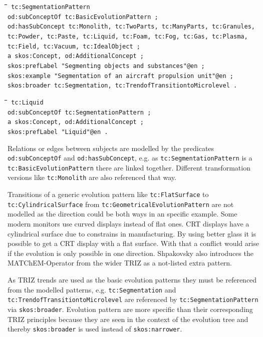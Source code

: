 \documentclass[11pt,a4paper]{article}
\newenvironment{code}{\tt \begin{tabbing}
\hskip12pt\=\hskip12pt\=\hskip12pt\=\hskip12pt\=\hskip5cm\=\hskip5cm\=\kill}
{\end{tabbing}}
\begin{document}
\begin{code}\tt
tc:SegmentationPattern \\
\> od:subConceptOf tc:BasicEvolutionPattern ; \\
\> od:hasSubConcept tc:Monolith, tc:TwoParts, tc:ManyParts, tc:Granules, \\
\> tc:Powder, tc:Paste, tc:Liquid, tc:Foam, tc:Fog, tc:Gas, tc:Plasma, \\
\> tc:Field, tc:Vacuum, tc:IdealObject ; \\
\> a skos:Concept, od:AdditionalConcept ; \\
\> skos:prefLabel "Segmenting objects and substances"@en ; \\
\> skos:example "Segmentation of an aircraft propulsion unit"@en ; \\
\> skos:broader tc:Segmentation, tc:TrendofTransitiontoMicrolevel .
\end{code}
\begin{code}\tt
tc:Liquid \\
\> od:subConceptOf tc:SegmentationPattern ; \\
\> a skos:Concept, od:AdditionalConcept ; \\
\> skos:prefLabel "Liquid"@en . \\
\end{code}

Relations or edges between subjects are modelled by the predicates
\texttt{od:subConceptOf} and \texttt{od:hasSubConcept}, e.g. as
\texttt{tc:SegmentationPattern} is a \texttt{tc:BasicEvolutionPattern} there
are linked together. Different transformation versions like
\texttt{tc:Monolith} are also referenced that way.

Transitions of a generic evolution pattern like \texttt{tc:FlatSurface} to
\texttt{tc:CylindricalSurface} from \texttt{tc:GeometricalEvolutionPattern}
are not modelled as the direction could be both ways in an specific
example. Some modern monitors use curved displays instead of flat ones. CRT
displays have a cylindrical surface due to constrains in manufacturing. By
using better glass it is possible to get a CRT display with a flat
surface. With that a conflict would arise if the evolution is only possible in
one direction. Shpakovsky also introduces the MATChEM-Operator from the wider
TRIZ as a not-listed extra pattern.

As TRIZ trends are used as the basic evolution patterns they must be
referenced from the modelled patterns, e.g. \texttt{tc:Segmentation} and
\texttt{tc:TrendofTransitiontoMicrolevel} are referenced by
\texttt{tc:SegmentationPattern} via \texttt{skos:broader}. Evolution pattern
are more specific than their corresponding TRIZ principles because they are
seen in the context of the evolution tree and thereby \texttt{skos:broader} is
used instead of \texttt{skos:narrower}.  
\end{document}
